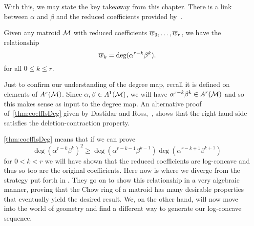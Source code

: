 \documentclass[12pt,oneside]{../../sfsuthesis}
\begin{document}
With this, we may state the key takeaway from this chapter.
There is a link between \( \alpha \) and \( \beta \) and the reduced coefficients provided by~\cite[Proposition~9.5]{adiprasitoHodgeTheoryCombinatorial2018}.
\begin{proposition}\th\label{thm:coeffIsDeg}
    Given any matroid \( \mathcal{M} \) with reduced coefficients \( \overline{w}_0, \dots, \overline{w}_r \), we have the relationship
    \[
        \overline{w}_k = \deg(\alpha^{r-k}\beta^k).
    \]
    for all \( 0 \leq k \leq r \).
\end{proposition}
Just to confirm our understanding of the degree map, recall it is defined on elements of \( A^r(\mathcal{M}) \).
Since \( \alpha, \beta \in A^1(\mathcal{M})\), we will have \( \alpha^{r-k}\beta^k \in A^r(\mathcal{M}) \) and so this makes sense as input to the degree map.
An alternative proof of~\th\ref{thm:coeffIsDeg} given by Dastidar and Ross,~\cite[Proposition~3.11]{dastidarMatroidPsiClasses2021}, shows that the right-hand side satisfies the deletion-contraction property.

\th\ref{thm:coeffIsDeg} means that if we can prove
\[
    \deg(\alpha^{r-k}\beta^k)^2 \geq \deg(\alpha^{r-k-1}\beta^{k-1}) \deg(\alpha^{r-k+1}\beta^{k+1})
\]
for \( 0 < k < r \) we will have shown that the reduced coefficients are log-concave and thus so too are the original coefficients.
Here now is where we diverge from the strategy put forth in \cite{adiprasitoHodgeTheoryCombinatorial2018}.
They go on to show this relationship in a very algebraic manner, proving that the Chow ring of a matroid has many desirable properties that eventually yield the desired result.
We, on the other hand, will now move into the world of geometry and find a different way to generate our log-concave sequence.
\end{document}
